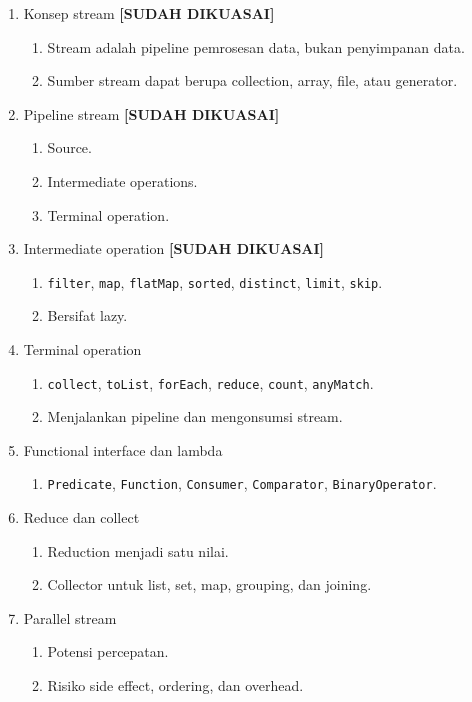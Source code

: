 \begin{enumerate}
    \item Konsep stream \textbf{[SUDAH DIKUASAI]}
    \begin{enumerate}
        \item Stream adalah pipeline pemrosesan data, bukan penyimpanan data.
        \item Sumber stream dapat berupa collection, array, file, atau generator.
    \end{enumerate}
    \item Pipeline stream \textbf{[SUDAH DIKUASAI]}
    \begin{enumerate}
        \item Source.
        \item Intermediate operations.
        \item Terminal operation.
    \end{enumerate}
    \item Intermediate operation \textbf{[SUDAH DIKUASAI]}
    \begin{enumerate}
        \item \texttt{filter}, \texttt{map}, \texttt{flatMap}, \texttt{sorted}, \texttt{distinct}, \texttt{limit}, \texttt{skip}.
        \item Bersifat lazy.
    \end{enumerate}
    \item Terminal operation
    \begin{enumerate}
        \item \texttt{collect}, \texttt{toList}, \texttt{forEach}, \texttt{reduce}, \texttt{count}, \texttt{anyMatch}.
        \item Menjalankan pipeline dan mengonsumsi stream.
    \end{enumerate}
    \item Functional interface dan lambda
    \begin{enumerate}
        \item \texttt{Predicate}, \texttt{Function}, \texttt{Consumer}, \texttt{Comparator}, \texttt{BinaryOperator}.
    \end{enumerate}
    \item Reduce dan collect
    \begin{enumerate}
        \item Reduction menjadi satu nilai.
        \item Collector untuk list, set, map, grouping, dan joining.
    \end{enumerate}
    \item Parallel stream
    \begin{enumerate}
        \item Potensi percepatan.
        \item Risiko side effect, ordering, dan overhead.
    \end{enumerate}
\end{enumerate}

